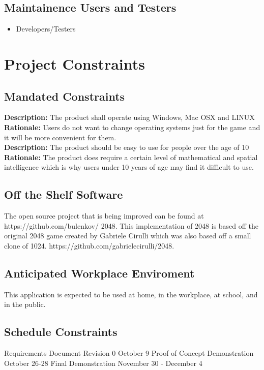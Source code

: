 \documentclass[12pt]{article}
\begin{document}
\subsection{Maintainence Users and Testers}
\begin{itemize}
\item Developers/Testers
\end{itemize}

\section{Project Constraints}
\subsection{Mandated Constraints}
\textbf{Description:} The product shall operate using Windows, Mac OSX and LINUX
\textbf{Rationale:} Users do not want to change operating systems just for the game and it will be more 
convenient for them.\\
\textbf{Description:} The product should be easy to use for people over the age of 10
\textbf{Rationale:} The product does require a certain level of mathematical and spatial intelligence which is why 
users under 10 years of age may find it difficult to use. 
\subsection{Off the Shelf Software}
\par\indent\indent The open source project that is being improved can be found at \\https://github.com/bulenkov/
2048.
This implementation of 2048 is based off the original 2048 game created by Gabriele Cirulli which was also 
based off a small clone of 1024. https://github.com/gabrielecirulli/2048.
\subsection{Anticipated Workplace Enviroment}
This application is expected to be used at home, in the workplace, at school, and in the public.\newline
\subsection{Schedule Constraints}
Requirements Document Revision 0	\hfill	October 9 \newline
Proof of Concept Demonstration \hfill		October 26-28 \newline
Final Demonstration \hfill				November 30 - December 4 \newline
\end{document}
